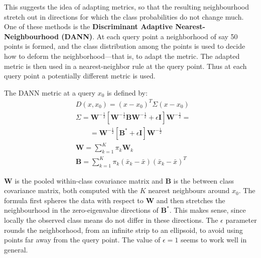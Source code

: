 \documentclass[12pt, letterpaper]{article}
\theoremstyle{definition}
\newcommand{\I}{\mathrm{\mathbf{I}}}
\begin{document}
This suggests the idea of adapting metrics, so that the resulting neighbourhood stretch out in directions for which the class probabilities do not change much. One of these methods is the \textbf{Discriminant Adaptive Nearest-Neighbourhood (DANN)}. 
At each query point a neighborhood of say 50 points is formed, and the class distribution among the points is used to decide how to deform the neighborhood—that is, to adapt the metric. The adapted metric is then used in a nearest-neighbor rule at the query point. Thus at each query point a potentially different metric is used.

The DANN metric at a query $x_0$ is defined by:
\begin{equation}
\begin{aligned}
&D(x,x_0) = (x-x_0)^T\Sigma (x-x_0)\\
&\Sigma = \mathbf{W}^{-\frac{1}{2}} \left[ \mathbf{W}^{-\frac{1}{2}}\mathbf{B}\mathbf{W}^{-\frac{1}{2}} + \epsilon \I \right] \mathbf{W}^{-\frac{1}{2}} = \\
&\quad\quad = \mathbf{W}^{-\frac{1}{2}}\left[ \mathbf{B}^*+\epsilon\I\right] \mathbf{W}^{-\frac{1}{2}}\\
&\mathbf{W} = \sum_{k=1}^K \pi_k  \mathbf{W}_k\\
& \mathbf{B} = \sum_{k=1}^K \pi_k  (\bar{x}_k - \bar{x})(\bar{x}_k - \bar{x})^T
\end{aligned}
\end{equation}

$ \mathbf{W}$ is the pooled within-class covariance matrix and $\mathbf{B}$ is the between class covariance matrix, both computed with the $K$ nearest neighbours around $x_0$.
The formula first spheres the data with respect to $\mathbf{W}$ and then stretches the neighbourhood in the zero-eigenvalue directions of $\mathbf{B}^*$.
This makes sense, since locally the observed class means do not differ in these directions. The $\epsilon$ parameter rounds the neighborhood, from an infinite strip to an ellipsoid, to avoid using points far away from the query point. The value of $\epsilon = 1$ seems to work well in general.
\end{document}
